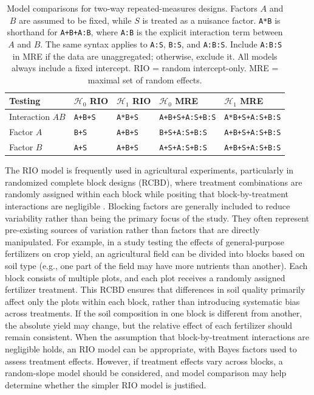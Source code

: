 \documentclass[preprint,12pt,authoryear]{elsarticle}
\begin{document}
\begin{table}[t]
	\centering
	\begin{tabular}{@{}lllll@{}}
		\toprule
		Testing          & $\mathcal{H}_0$ RIO & $\mathcal{H}_1$ RIO & $\mathcal{H}_0$ MRE    & $\mathcal{H}_1$ MRE    \\ \midrule
		Interaction $AB$ & \texttt{A+B+S}      & \texttt{A*B+S}      & \texttt{A+B+S+A:S+B:S} & \texttt{A*B+S+A:S+B:S} \\
		Factor $A$       & \texttt{B+S}        & \texttt{A+B+S}      & \texttt{B+S+A:S+B:S}   & \texttt{A+B+S+A:S+B:S} \\
		Factor $B$       & \texttt{A+S}        & \texttt{A+B+S}      & \texttt{A+S+A:S+B:S}   & \texttt{A+B+S+A:S+B:S} \\ \bottomrule
	\end{tabular}
\caption{Model comparisons for two-way repeated-measures designs. Factors $A$ and $B$ are assumed to be fixed, while $S$ is treated as a nuisance factor. \texttt{A*B} is shorthand for \texttt{A+B+A:B}, where \texttt{A:B} is the explicit interaction term between $A$ and $B$. The same syntax applies to \texttt{A:S}, \texttt{B:S}, and \texttt{A:B:S}. Include \texttt{A:B:S} in MRE if the data are unaggregated; otherwise, exclude it. All models always include a fixed intercept. RIO = random intercept-only. MRE = maximal set of random effects.}\label{tbl2}
\end{table}

The RIO model is frequently used in agricultural experiments, particularly in randomized complete block designs (RCBD), where treatment combinations are randomly assigned within each block while positing that block-by-treatment interactions are negligible  \citetext{%
	\citealp[pp.~606–608]{kruschke_doing_2014}; %
	\citealp[chap.~5]{montgomery_design_2020}}.
Blocking factors are generally included to reduce variability rather than being the primary focus of the study. They often represent pre-existing sources of variation rather than factors that are directly manipulated. For example, in a study testing the effects of general-purpose fertilizers on crop yield, an agricultural field can be divided into blocks based on soil type (e.g., one part of the field may have more nutrients than another). Each block consists of multiple plots, and each plot receives a randomly assigned fertilizer treatment. This RCBD ensures that differences in soil quality primarily affect only the plots within each block, rather than introducing systematic bias across treatments. If the soil composition in one block is different from another, the absolute yield may change, but the relative effect of each fertilizer should remain consistent. When the assumption that block-by-treatment interactions are negligible holds, an RIO model can be appropriate, with Bayes factors used to assess treatment effects. However, if treatment effects vary across blocks, a random-slope model should be considered, and model comparison may help determine whether the simpler RIO model is justified.
\end{document}
